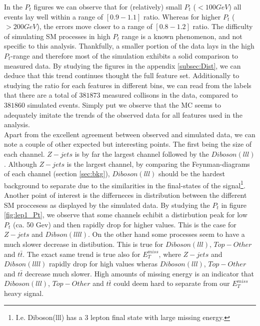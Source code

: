 In the $P_t$ figures we can observe that for (relatively) small $P_t$ ($<100GeV$) all events lay well within a range of $[0.9-1.1]$ ratio. 
Whereas for higher $P_t$ ($>200GeV$), the errors move closer to a range of $[0.8-1.2]$ ratio. The difficulty of simulating \ac{SM} processes 
in high $P_t$ range is a known phenomenon, and not specific to this analysis. Thankfully, a smaller portion of the data lays in the high $P_t$-range
and therefore most of the simulation exhibits a solid comparison to measured data. By studying the figures in the appendix \ref{subsec:Dist}, 
we can deduce that this trend continues thought the full feature set. Additionally to studying the ratio for each features in different bins,
we can read from the labels that there are a total of $381873$ measured collisons in the data, compared to $381860$ simulated events.
Simply put we observe that the \ac{MC} seems to adequately imitate the trends of the observed data for all features used in the analysis. 
\\
Apart from the excellent agreement between observed and simulated data, we can note a couple of other expected
but interesting points. The first being the size of each channel. $Z-jets$ is by far the largest channel followed
by the $Diboson (lll)$. Although $Z-jets$ is the largest channel, by comparing the Feynman-diagrams of each channel
(section \ref{sec:bkg}), $Diboson(lll)$ should be the hardest background to separate due to the similarities in the 
final-states of the signal\footnote{I.e. Diboson(lll) has a 3 lepton final state with large missing energy.}. Another 
point of interest is the differneces in distribution between the different \ac{SM} proccesess as displayed by the 
simulated data. By studying the $P_t$ in figure \ref{fig:lep1_Pt}, we observe that some channels echibit a distirbution  
peak for low $P_t$ (ca. 50 Gev) and then rapidly drop for higher values. This is the case for $Z-jets$ and $Dibson (llll)$.
On the other hand some processes seem to have a much slower decrease in distibution. This is true for $Diboson(lll)$, $Top-Other$
and $t\bar{t}$. The exact same trend is true also for $E_T^{miss}$, where $Z-jets$ and $Dibson (llll)$ rapidly drop for high values 
wheras $Diboson(lll)$, $Top-Other$ and $t\bar{t}$ decrease much slower. High amounts of missing energy is an indicator that 
$Diboson(lll)$, $Top-Other$ and $t\bar{t}$  could deem hard to separate from our $E_T^{miss}$ heavy signal.
